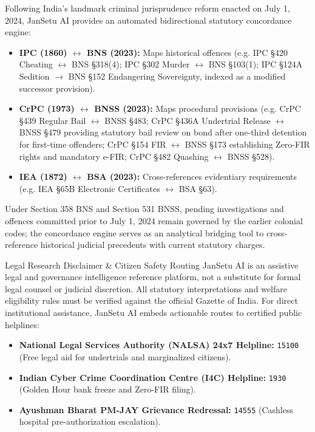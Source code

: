 \documentclass[12pt,a4paper,oneside]{report}
\begin{document}
Following India's landmark criminal jurisprudence reform enacted on July 1, 2024, JanSetu AI provides an automated bidirectional statutory concordance engine:
\begin{itemize}[itemsep=2pt]
    \item \textbf{IPC (1860) $\leftrightarrow$ BNS (2023):} Maps historical offences (e.g. IPC \S 420 Cheating $\leftrightarrow$ BNS \S 318(4); IPC \S 302 Murder $\leftrightarrow$ BNS \S 103(1); IPC \S 124A Sedition $\rightarrow$ BNS \S 152 Endangering Sovereignty, indexed as a modified successor provision).
    \item \textbf{CrPC (1973) $\leftrightarrow$ BNSS (2023):} Maps procedural provisions (e.g. CrPC \S 439 Regular Bail $\leftrightarrow$ BNSS \S 483; CrPC \S 436A Undertrial Release $\leftrightarrow$ BNSS \S 479 providing statutory bail review on bond after one-third detention for first-time offenders; CrPC \S 154 FIR $\leftrightarrow$ BNSS \S 173 establishing Zero-FIR rights and mandatory e-FIR; CrPC \S 482 Quashing $\leftrightarrow$ BNSS \S 528).
    \item \textbf{IEA (1872) $\leftrightarrow$ BSA (2023):} Cross-references evidentiary requirements (e.g. IEA \S 65B Electronic Certificates $\leftrightarrow$ BSA \S 63).
\end{itemize}
Under Section 358 BNS and Section 531 BNSS, pending investigations and offences committed prior to July 1, 2024 remain governed by the earlier colonial codes; the concordance engine serves as an analytical bridging tool to cross-reference historical judicial precedents with current statutory charges.

\begin{infobox}{Legal Research Disclaimer \& Citizen Safety Routing}
JanSetu AI is an assistive legal and governance intelligence reference platform, not a substitute for formal legal counsel or judicial discretion. All statutory interpretations and welfare eligibility rules must be verified against the official Gazette of India. For direct institutional assistance, JanSetu AI embeds actionable routes to certified public helplines:
\begin{itemize}[itemsep=1pt]
    \item \textbf{National Legal Services Authority (NALSA) 24x7 Helpline:} \texttt{15100} (Free legal aid for undertrials and marginalized citizens).
    \item \textbf{Indian Cyber Crime Coordination Centre (I4C) Helpline:} \texttt{1930} (Golden Hour bank freeze and Zero-FIR filing).
    \item \textbf{Ayushman Bharat PM-JAY Grievance Redressal:} \texttt{14555} (Cashless hospital pre-authorization escalation).
\end{itemize}
\end{infobox}
\end{document}
